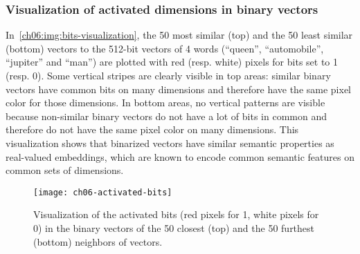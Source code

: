    \subsubsection{Visualization of activated dimensions in binary vectors}
      In~\autoref{ch06:img:bits-visualization}, the 50 most similar (top) and
      the 50 least similar (bottom) vectors to the 512-bit vectors of 4 words
      (``queen'', ``automobile'', ``jupiter'' and ``man'') are plotted with red
      (resp. white) pixels for bits set to 1 (resp. 0). Some vertical stripes
      are clearly visible in top areas: similar binary vectors have common bits
      on many dimensions and therefore have the same pixel color for those
      dimensions. In bottom areas, no vertical patterns are visible because
      non-similar binary vectors do not have a lot of bits in common and
      therefore do not have the same pixel color on many dimensions. This
      visualization shows that binarized vectors have similar semantic
      properties as real-valued embeddings, which are known to encode common
      semantic features on common sets of dimensions.

      \begin{figure}[h]
        \centering
          \texttt{[image: ch06-activated-bits]}
          \caption[Visualization of the activated bits in some binary
          vectors.]{Visualization of the activated bits (red pixels for 1,
          white pixels for 0) in the binary vectors of the 50 closest
          (top) and the 50 furthest (bottom) neighbors of vectors.}
          \label{ch06:img:bits-visualization}
      \end{figure}

